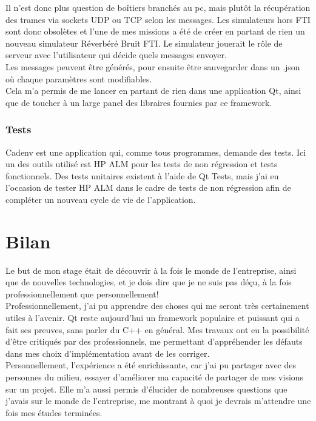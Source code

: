 \documentclass{rapport}
\begin{document}
Il n'est donc plus question de boîtiers branchés au pc, mais plutôt la récupération des trames via sockets UDP ou TCP selon les messages. Les simulateurs hors FTI sont donc obsolètes et l'une de mes missions a été de créer en partant de rien un nouveau simulateur Réverbéré Bruit FTI. Le simulateur jouerait le rôle de serveur avec l'utilisateur qui décide quels messages envoyer. \\

Les messages peuvent être générés, pour ensuite être sauvegarder dans un .json où chaque paramètres sont modifiables.\\

Cela m'a permis de me lancer en partant de rien dans une application Qt, ainsi que de toucher à un large panel des libraires fournies par ce framework.

\subsubsection{Tests}

Cadenv est une application qui, comme tous programmes, demande des tests. Ici un des outils utilisé est HP ALM pour les tests de non régression et tests fonctionnels. Des tests unitaires existent à l'aide de Qt Tests, mais j'ai eu l'occasion de tester HP ALM dans le cadre de tests de non régression afin de compléter un nouveau cycle de vie de l'application.

\newpage

\section{Bilan}

Le but de mon stage était de découvrir à la fois le monde de l'entreprise, ainsi que de nouvelles technologies, et je dois dire que je ne suis pas déçu, à la fois professionnellement que personnellement!\\

Professionnellement, j'ai pu apprendre des choses qui me seront très certainement utiles à l'avenir. Qt reste aujourd'hui un framework populaire et puissant qui a fait ses preuves, sans parler du C++ en général. Mes travaux ont eu la possibilité d'être critiqués par des professionnels, me permettant d'appréhender les défauts dans mes choix d'implémentation avant de les corriger. \\

Personnellement, l'expérience a été enrichissante, car j'ai pu partager avec des personnes du milieu, essayer d'améliorer ma capacité de partager de mes visions sur un projet. Elle m'a aussi permis d'élucider de nombreuses questions que j'avais sur le monde de l'entreprise, me montrant à quoi je devrais m'attendre une fois mes études terminées.
\end{document}
